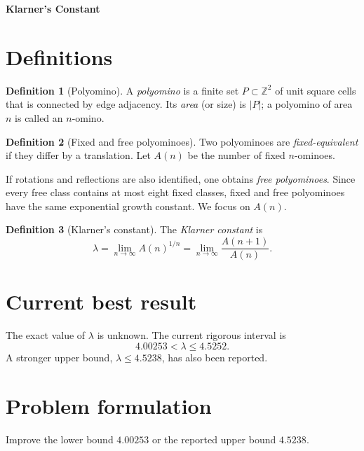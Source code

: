 \documentclass[11pt,a4paper]{article}
\theoremstyle{definition}
\newtheorem{definition}{Definition}
\newcommand{\A}{A}
\newcommand{\klarner}{\lambda}
\begin{document}
\begin{center}
  {\Large\bfseries Klarner's Constant}
\end{center}
\section{Definitions}

\begin{definition}[Polyomino]
A \emph{polyomino} is a finite set $P\subset \mathbb Z^2$ of unit square cells that is
connected by edge adjacency.  Its \emph{area} (or size) is $|P|$; a polyomino of
area $n$ is called an $n$-omino.
\end{definition}

\begin{definition}[Fixed and free polyominoes]
Two polyominoes are \emph{fixed-equivalent} if they differ by a translation.  Let
$\A(n)$ be the number of fixed $n$-ominoes.  
\end{definition}

If rotations and reflections are also
identified, one obtains \emph{free polyominoes}.  Since every free class contains at
most eight fixed classes, fixed and free polyominoes have the same exponential growth
constant.  We focus on $\A(n)$.

\begin{definition}[Klarner's constant]
The \emph{Klarner constant} is
\begin{equation}\label{eq:klarner}
 \klarner
 =\lim_{n\to\infty}\A(n)^{1/n}
 =\lim_{n\to\infty}\frac{\A(n+1)}{\A(n)}.
\end{equation}
\end{definition}


\section{Current best result}
The exact value of $\klarner$ is unknown. The current rigorous interval is
\begin{equation}
  4.00253<\klarner\leq 4.5252.
\end{equation}
A stronger upper bound, $\klarner\leq 4.5238$, has also been reported.

\section{Problem formulation}
Improve the lower bound $4.00253$ or the reported upper bound $4.5238$.
\end{document}
